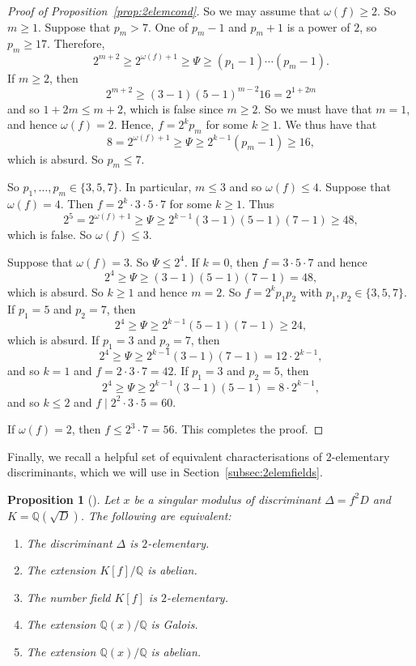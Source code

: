\documentclass[12pt,a4paper,oneside]{amsart}
\newtheorem{proposition}[theorem]{Proposition}
\begin{document}
\begin{proof}[Proof of Proposition~\ref{prop:2elemcond}]
	So we may assume that $\omega(f) \geq 2$. So $m \geq 1$. Suppose that $p_m > 7$. One of $p_m - 1$ and $p_m + 1$ is a power of $2$, so $p_m \geq 17$. Therefore,
	\[ 2^{m+2} \geq 2^{\omega(f) + 1} \geq \Psi \geq (p_1 - 1) \cdots (p_m - 1).\]
	If $m \geq 2$, then
	\[ 2^{m+2} \geq (3 - 1) (5 - 1)^{m-2} 16 = 2^{1 + 2m}\]
	and so $1 + 2m \leq m + 2$, which is false since $m \geq 2$. So we must have that $m = 1$, and hence $\omega(f) = 2$. Hence, $f = 2^k p_m$ for some $k \geq 1$. We thus have that
	\[ 8 = 2^{\omega(f) + 1} \geq \Psi \geq 2^{k-1} (p_m - 1) \geq 16,\]
	which is absurd. So $p_m \leq 7$. 
	
	So $p_1, \ldots, p_m \in \{3, 5, 7\}$. In particular, $m \leq 3$ and so $\omega(f) \leq 4$. Suppose that $\omega(f) = 4$. Then $f = 2^k \cdot 3 \cdot 5 \cdot 7$ for some $k \geq 1$. Thus
	\[ 2^5 = 2^{\omega(f)+1} \geq \Psi \geq 2^{k-1} (3-1)(5-1)(7-1) \geq 48,\]
	which is false. So $\omega(f) \leq 3$.
	
	Suppose that $\omega(f) = 3$. So $\Psi \leq 2^4$. If $k = 0$, then $f = 3 \cdot 5 \cdot 7$ and hence
	\[ 2^4 \geq \Psi \geq (3-1)(5-1)(7-1) = 48,\]
	which is absurd. So $k \geq 1$ and hence $m = 2$. So $f = 2^k p_1 p_2$ with $p_1, p_2 \in \{3, 5, 7\}$. If $p_1 = 5$ and $p_2 = 7$, then 
	\[ 2^4 \geq \Psi \geq 2^{k-1} (5-1) (7-1) \geq 24,\]
	which is absurd. If $p_1 = 3$ and $p_2 = 7$, then
	\[2^4 \geq \Psi \geq 2^{k-1} (3-1)(7-1) = 12 \cdot 2^{k-1},\]
	and so $k=1$ and $f = 2 \cdot 3 \cdot 7 = 42$. If $p_1 = 3$ and $p_2 = 5$, then
	\[2^4 \geq \Psi \geq 2^{k-1} (3-1)(5-1) = 8 \cdot 2^{k-1},\]
	and so $k \leq 2$ and $f \mid 2^2 \cdot 3 \cdot 5 = 60$.
	
	If $\omega(f) = 2$, then $f \leq 2^3 \cdot 7 = 56$. This completes the proof.
\end{proof}

Finally, we recall a helpful set of equivalent characterisations of $2$-elementary discriminants, which we will use in Section~\ref{subsec:2elemfields}.

\begin{proposition}[{\cite[Cor.~3.3]{AllombertBiluMadariaga15}}]\label{prop:2elemequiv}
Let $x$ be a singular modulus of discriminant $\Delta = f^2 D$ and $K = \mathbb{Q}(\sqrt{D})$. The following are equivalent:
	\begin{enumerate}
		\item The discriminant $\Delta$ is $2$-elementary.
		\item The extension $K[f]/\mathbb{Q}$ is abelian.
		\item The number field $K[f]$ is $2$-elementary.
		\item The extension $\mathbb{Q}(x) / \mathbb{Q}$ is Galois.
		\item The extension $\mathbb{Q}(x) / \mathbb{Q}$ is abelian.
	\end{enumerate}
\end{proposition}
\end{document}
